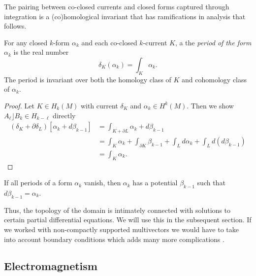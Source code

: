\documentclass[conf]{new-aiaa}
\begin{document}
The pairing between co-closed currents and closed forms captured through integration is a (co)homological invariant that has ramifications in analysis that follows.
\begin{proposition}
\label{def:period}
For any closed $k$-form $\alpha_k$ and each co-closed $k$-current $K$, a the \emph{period of the form $\alpha_k$} is the real number
\begin{equation}
\delta_K(\alpha_k)=\int_K \alpha_k.
\end{equation}
The period is invariant over both the homology class of $K$ and cohomology class of $\alpha_k$.
\end{proposition}
\begin{proof}
Let $K \in H_k(M)$ with current $\delta_K$ and $\alpha_k \in H^k(M)$. Then we show $A_\ell \rfloor B_k \in H_{k-\ell}$ directly
\begin{align}
(\delta_K+\partial \delta_L)[\alpha_k + d \beta_{k-1}] &= \int_{K+\partial L} \alpha_k + d\beta_{k-1}\\
&= \int_K \alpha_k + \int_{\partial K} \beta_{k-1} + \int_L d \alpha_k + \int_L d(d\beta_{k-1})\\
&= \int_K \alpha_k.
\end{align}
\end{proof}
\begin{proposition}
\label{prop:periods}
    If all periods of a form $\alpha_k$ vanish, then $\alpha_k$ has a potential $\beta_{k-1}$ such that $d\beta_{k-1}=\alpha_k$.
\end{proposition}
Thus, the topology of the domain is intimately connected with solutions to certain partial differential equations. We will use this in the subsequent section. If we worked with non-compactly supported multivectors we would have to take into account boundary conditions which adds many more complications \cite{schwarz_hodge_1995}.

\subsection{Electromagnetism}
\end{document}
